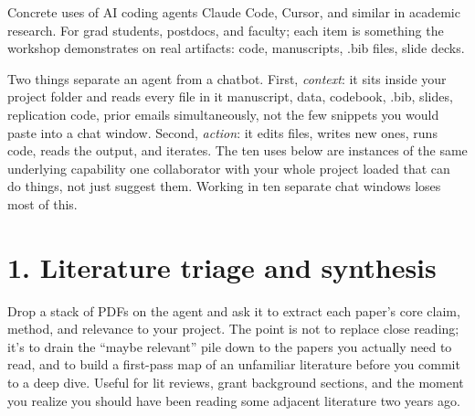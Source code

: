 \documentclass[11pt]{article}
\begin{document}
\thispagestyle{fancy}

\noindent{\color{redesteal}\rule{\linewidth}{1.5pt}}\par
\vspace{0.5em}
\vspace{0.5em}
\vspace{0.4em}
\noindent{\color{redesteal}\rule{\linewidth}{0.5pt}}\par
\vspace{1.8em}

Concrete uses of AI coding agents \textemdash{} Claude Code, Cursor, and similar \textemdash{} in academic research. For grad students, postdocs, and faculty; each item is something the workshop demonstrates on real artifacts: code, manuscripts, .bib files, slide decks.

Two things separate an agent from a chatbot. First, \emph{context}: it sits inside your project folder and reads every file in it \textemdash{} manuscript, data, codebook, .bib, slides, replication code, prior emails \textemdash{} simultaneously, not the few snippets you would paste into a chat window. Second, \emph{action}: it edits files, writes new ones, runs code, reads the output, and iterates. The ten uses below are instances of the same underlying capability \textemdash{} one collaborator with your whole project loaded that can do things, not just suggest them. Working in ten separate chat windows loses most of this.

\section*{1. Literature triage and synthesis}

Drop a stack of PDFs on the agent and ask it to extract each paper's core claim, method, and relevance to your project. The point is not to replace close reading; it's to drain the ``maybe relevant'' pile down to the papers you actually need to read, and to build a first-pass map of an unfamiliar literature before you commit to a deep dive. Useful for lit reviews, grant background sections, and the moment you realize you should have been reading some adjacent literature two years ago.
\end{document}
